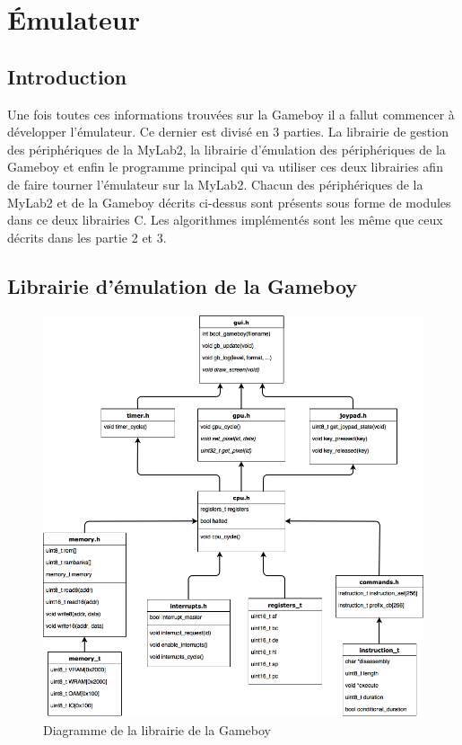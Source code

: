 \documentclass[a4paper]{article}
\begin{document}
\section{Émulateur}
\subsection{Introduction}
Une fois toutes ces informations trouvées sur la Gameboy il a fallut commencer
à développer l'émulateur. Ce dernier est divisé en 3 parties. La librairie de gestion
des périphériques de la MyLab2, la librairie d'émulation des périphériques de la Gameboy
et enfin le programme principal qui va utiliser ces deux librairies afin de faire
tourner l'émulateur sur la MyLab2. Chacun des périphériques de la MyLab2 et de la
Gameboy décrits  ci-dessus sont présents sous forme de modules dans ce deux librairies C.
Les algorithmes implémentés sont les même que ceux décrits dans les partie 2 et 3. \\

\subsection{Librairie d'émulation de la Gameboy}

\begin{figure}[!h]
  \centering
  \includegraphics[scale=0.4]{images/class_diag.png}
  \caption{Diagramme de la librairie de la Gameboy}
\end{figure}
\end{document}
